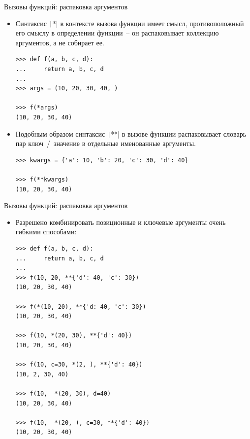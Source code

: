 \documentclass[aspectratio=169]{beamer}%
\begin{document}
\begin{frame}[fragile]{Вызовы функций: распаковка аргументов}

\scriptsize
\begin{itemize}
\item Синтаксис \texttt|*| в контексте вызова функции имеет смысл, противоположный его смыслу в определении функции~-- он распаковывает коллекцию аргументов, а не собирает ее.

\begin{verbatim}
>>> def f(a, b, c, d):
...     return a, b, c, d
...
>>> args = (10, 20, 30, 40, )

>>> f(*args)
(10, 20, 30, 40)
\end{verbatim}

\item Подобным образом синтаксис \texttt|**| в вызове функции распаковывает словарь пар ключ~/~значение в отдельные именованные аргументы.

\begin{verbatim}
>>> kwargs = {'a': 10, 'b': 20, 'c': 30, 'd': 40}

>>> f(**kwargs)
(10, 20, 30, 40)
\end{verbatim}
\end{itemize}
\vfill
\end{frame}


\begin{frame}[fragile]{Вызовы функций: распаковка аргументов}
\scriptsize
\begin{itemize}
\item Разрешено комбинировать позиционные и ключевые аргументы очень гибкими способами:

\begin{verbatim}
>>> def f(a, b, c, d):
...     return a, b, c, d
...
>>> f(10, 20, **{'d': 40, 'c': 30})
(10, 20, 30, 40)

>>> f(*(10, 20), **{'d: 40, 'c': 30})
(10, 20, 30, 40)

>>> f(10, *(20, 30), **{'d': 40})
(10, 20, 30, 40)

>>> f(10, c=30, *(2, ), **{'d': 40})
(10, 2, 30, 40)

>>> f(10,  *(20, 30), d=40)
(10, 20, 30, 40)

>>> f(10,  *(20, ), c=30, **{'d': 40})
(10, 20, 30, 40)
\end{verbatim}

\end{itemize}
\vfill
\end{frame}
\end{document}
